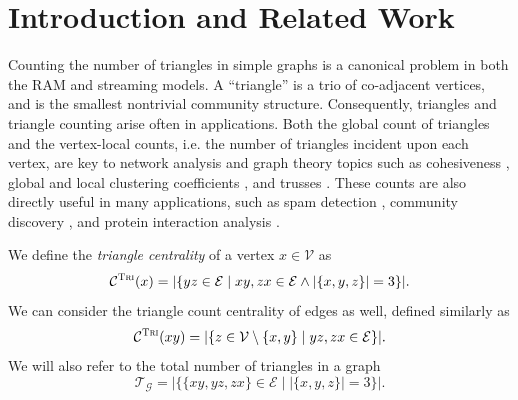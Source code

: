 \documentclass[10]{article}
\newcommand{\algoname}[1]{\textnormal{\textsc{#1}}}
\begin{document}
 

\section{Introduction and Related Work}
 \label{DS:sec:intro}

Counting the number of triangles in simple graphs is a canonical problem in both the RAM and streaming models.
A ``triangle'' is a trio of co-adjacent vertices, and is the smallest nontrivial community structure.
Consequently, triangles and triangle counting arise often in applications.
Both the global count of triangles and the vertex-local counts, i.e. the number of triangles incident upon each vertex, are key to network analysis and graph theory topics such as cohesiveness \cite{lim2015mascot}, global and local clustering coefficients \cite{tsourakakis2008fast}, and trusses \cite{cohen2008trusses}.
These counts are also directly useful in many applications, such as spam detection \cite{becchetti2010efficient},  community discovery \cite{wang2010triangulation, berry2011tolerating}, and protein interaction analysis \cite{milo2002network}.

We define the \emph{triangle centrality} of a vertex $x \in \mathcal{V}$ as
%
\begin{equation}
	\mathcal{C}^{\algoname{Tri}}(x) = |\{yz \in \mathcal{E} \mid xy, zx \in \mathcal{E} \wedge |\{x, y, z\}| = 3\}|.
\end{equation}
%
We can consider the triangle count centrality of edges as well, defined similarly as
%
\begin{equation}
	\mathcal{C}^{\algoname{Tri}}(xy) = |\{z \in \mathcal{V} \setminus \{x,y\} \mid yz, zx \in \mathcal{E}\}|.
\end{equation}
%
We will also refer to the total number of triangles in a graph 
%
\begin{equation}
	\mathcal{T}_\mathcal{G} = |\{ \{xy, yz, zx\} \in \mathcal{E} \mid |\{x, y, z\}| = 3 \} |.
\end{equation}
%
\end{document}

